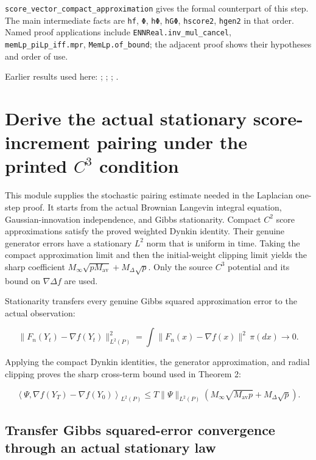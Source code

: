 \documentclass[11pt,a4paper]{report}
\begin{document}
\begin{leanbox}
\texttt{score\_\allowbreak{}vector\_\allowbreak{}compact\_\allowbreak{}approximation} gives the formal counterpart of this step. The main intermediate facts are \texttt{hf}, \texttt{Φ}, \texttt{h\allowbreak{}Φ}, \texttt{h\allowbreak{}GΦ}, \texttt{hscore2}, \texttt{hgen2} in that order. Named proof applications include \texttt{ENNReal.\allowbreak{}inv\_\allowbreak{}mul\_\allowbreak{}cancel}, \texttt{mem\allowbreak{}Lp\_\allowbreak{}pi\allowbreak{}Lp\_\allowbreak{}iff.\allowbreak{}mpr}, \texttt{Mem\allowbreak{}Lp.\allowbreak{}of\_\allowbreak{}bound}; the adjacent proof shows their hypotheses and order of use.
\end{leanbox}


Earlier results used here: \cite[Section~3.26.2]{LangevinLean2026ULASC}; \cite[Section~3.26.3]{LangevinLean2026ULASC}; \cite[Section~3.26.9]{LangevinLean2026ULASC}; \cite[Section~3.46.2]{LangevinLean2026ULASC}.
\section{\texorpdfstring{Derive the actual stationary score-increment pairing under the printed \(C^{3}\) condition}{Derive the actual stationary score-increment pairing under the printed C³ condition}}
\label{proof-module-AverageLMC-LaplacianPairing-lean}


This module supplies the stochastic pairing estimate needed in the Laplacian one-step proof. It starts from the actual Brownian Langevin integral equation, Gaussian-innovation independence, and Gibbs stationarity. Compact \(C^{2}\) score approximations satisfy the proved weighted Dynkin identity. Their genuine generator errors have a stationary \(L^{2}\) norm that is uniform in time. Taking the compact approximation limit and then the initial-weight clipping limit yields the sharp coefficient \(M_\infty\sqrt{pM_{\mathrm{av}}}+M_\Delta\sqrt p\). Only the source \(C^{3}\) potential and its bound on \(\nabla\Delta f\) are used.



Stationarity transfers every genuine Gibbs squared approximation error to the actual observation:


\[\|F_n(Y_t)-\nabla f(Y_t)\|_{L^2(P)}^2
=\int\|F_n(x)-\nabla f(x)\|^2\,\pi(dx)\longrightarrow0.\]


Applying the compact Dynkin identities, the generator approximation, and radial clipping proves the sharp cross-term bound used in Theorem 2:


\[\left\langle\Psi,\nabla f(Y_T)-\nabla f(Y_0)\right\rangle_{L^2(P)}
\le T\|\Psi\|_{L^2(P)}
\left(M_\infty\sqrt{M_{\mathrm{av}}p}+M_\Delta\sqrt p\right).\]\subsection{\texorpdfstring{Transfer Gibbs squared-error convergence through an actual stationary law}{Transfer Gibbs squared-error convergence through an actual stationary law}}
\label{report-step-AverageLMC-LaplacianPairing-lean-1}
\end{document}
